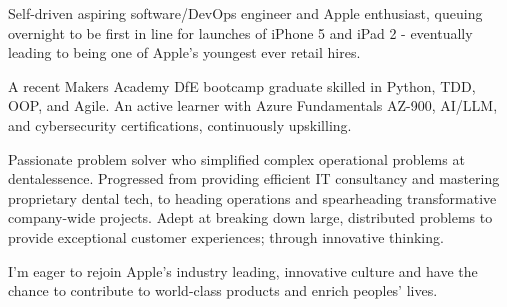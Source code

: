 

\begin{cvparagraph}

Self-driven aspiring software/DevOps engineer and Apple enthusiast, queuing overnight to be first in line for launches of iPhone 5 and iPad 2 - eventually leading to being one of Apple’s youngest ever retail hires.

A recent Makers Academy DfE bootcamp graduate skilled in Python, TDD, OOP, and Agile. An active learner with Azure Fundamentals AZ-900, AI/LLM, and cybersecurity certifications, continuously upskilling.

Passionate problem solver who simplified complex operational problems at dentalessence. Progressed from providing efficient IT consultancy and mastering proprietary dental tech, to heading operations and spearheading transformative company-wide projects. Adept at breaking down large, distributed problems to provide exceptional customer experiences; through innovative thinking.

I’m eager to rejoin Apple’s industry leading, innovative culture and have the chance to contribute to world-class products and enrich peoples’ lives.
\end{cvparagraph}